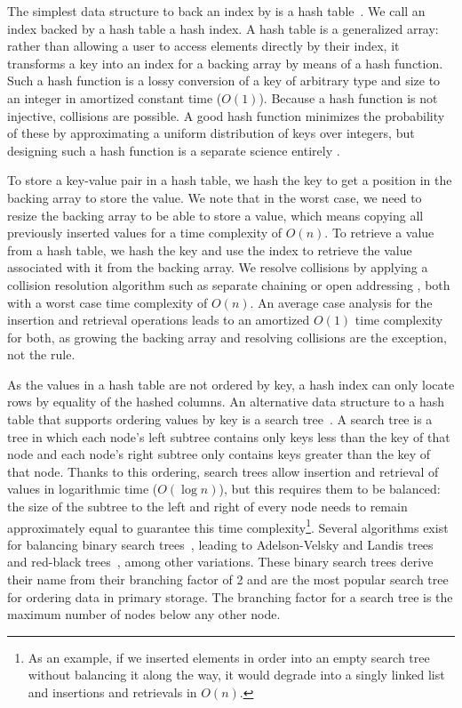 The simplest data structure to back an index by is a hash table~\citep{DBLP:books/daglib/0023376}.
We call an index backed by a hash table a hash index.
A hash table is a generalized array\thinspace: rather than allowing a user to access elements directly by their index, it transforms a key into an index for a backing array by means of a hash function.
Such a hash function is a lossy conversion of a key of arbitrary type and size to an integer in amortized constant time (\(O(1)\)).
Because a hash function is not injective, collisions are possible.
A good hash function minimizes the probability of these by approximating a uniform distribution of keys over integers, but designing such a hash function is a separate science entirely \citep{DBLP:books/daglib/0023376}.

To store a key-value pair in a hash table, we hash the key to get a position in the backing array to store the value.
We note that in the worst case, we need to resize the backing array to be able to store a value, which means copying all previously inserted values for a time complexity of \(O(n)\).
To retrieve a value from a hash table, we hash the key and use the index to retrieve the value associated with it from the backing array.
We resolve collisions by applying a collision resolution algorithm such as separate chaining or open addressing \citep{DBLP:books/daglib/0023376}, both with a worst case time complexity of \(O(n)\).
An average case analysis for the insertion and retrieval operations leads to an amortized \(O(1)\) time complexity for both, as growing the backing array and resolving collisions are the exception, not the rule.

As the values in a hash table are not ordered by key, a hash index can only locate rows by equality of the hashed columns.
An alternative data structure to a hash table that supports ordering values by key is a search tree~\citep{DBLP:books/daglib/0023376}.
A search tree is a tree in which each node's left subtree contains only keys less than the key of that node and each node's right subtree only contains keys greater than the key of that node.
Thanks to this ordering, search trees allow insertion and retrieval of values in logarithmic time (\(O(\log n)\)), but this requires them to be balanced\thinspace: the size of the subtree to the left and right of every node needs to remain approximately equal to guarantee this time complexity\footnote{As an example, if we inserted elements in order into an empty search tree without balancing it along the way, it would degrade into a singly linked list and insertions and retrievals in \(O(n)\).}.
Several algorithms exist for balancing binary search trees~\citep{DBLP:books/daglib/0023376}, leading to Adelson-Velsky and Landis trees~\citep{DBLP:books/daglib/0029345} and red-black trees~\citep{DBLP:books/daglib/0023376}, among other variations.
These binary search trees derive their name from their branching factor of 2 and are the most popular search tree for ordering data in primary storage.
The branching factor for a search tree is the maximum number of nodes below any other node.

